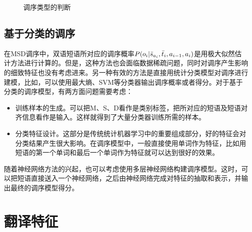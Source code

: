 \begin{figure}[htp]
\centering

\caption{调序类型的判断}
\label{fig:7-22}
\end{figure}


\subsection{基于分类的调序}

\parinterval 在MSD调序中，双语短语所对应的调序概率${P}(o_i| \bar{s}_{a_i}, \bar{t}_i, a_{i-1}, a_i)$是用极大似然估计方法进行计算的。但是，这种方法也会面临数据稀疏问题，同时对调序产生影响的细致特征也没有考虑进来。另一种有效的方法是直接用统计分类模型对调序进行建模，比如，可以使用最大熵、SVM等分类器输出调序概率或者得分。对于基于分类的调序模型，有两方面问题需要考虑：

\begin{itemize}
\vspace{0.5em}
\item 训练样本的生成。可以把M、S、D看作是类别标签，把所对应的短语及短语对齐信息看作是输入。这样就得到了大量分类器训练所需的样本。
\vspace{0.5em}
\item 分类特征设计。这部分是传统统计机器学习中的重要组成部分，好的特征会对分类结果产生很大影响。在调序模型中，一般直接使用单词作为特征，比如用短语的第一个单词和最后一个单词作为特征就可以达到很好的效果。
\vspace{0.5em}
\end{itemize}

\parinterval 随着神经网络方法的兴起，也可以考虑使用多层神经网络构建调序模型。这时，可以把短语直接送入一个神经网络，之后由神经网络完成对特征的抽取和表示，并输出最终的调序模型得分。

\sectionnewpage
\section{翻译特征}

